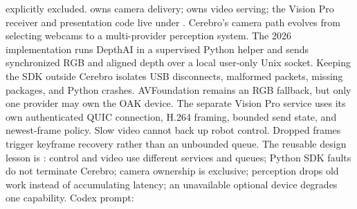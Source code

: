 {}explicitly excluded.\markdownRendererInterblockSeparator
{}\markdownRendererThematicBreak{}\markdownRendererInterblockSeparator
{}
\markdownRendererSectionEnd \markdownRendererSectionBegin
{}\markdownRendererInterblockSeparator
{}\markdownRendererBlockQuoteBegin
{}  owns camera delivery;  owns video serving; the Vision Pro receiver and presentation code live under .\markdownRendererBlockQuoteEnd \markdownRendererInterblockSeparator
{}Cerebro's camera path evolves from selecting webcams to a multi-provider\markdownRendererSoftLineBreak
{}perception system.\markdownRendererParagraphSeparator
{}The 2026 implementation runs DepthAI in a supervised Python helper and sends\markdownRendererSoftLineBreak
{}synchronized RGB and aligned depth over a local user-only Unix socket. Keeping\markdownRendererSoftLineBreak
{}the SDK outside Cerebro isolates USB disconnects, malformed packets, missing\markdownRendererSoftLineBreak
{}packages, and Python crashes. AVFoundation remains an RGB fallback, but only\markdownRendererSoftLineBreak
{}one provider may own the OAK device.\markdownRendererParagraphSeparator
{}The separate Vision Pro service uses its own authenticated QUIC connection,\markdownRendererSoftLineBreak
{}H.264 framing, bounded send state, and newest-frame policy. Slow video cannot\markdownRendererSoftLineBreak
{}back up robot control. Dropped frames trigger keyframe recovery rather than an\markdownRendererSoftLineBreak
{}unbounded queue.\markdownRendererParagraphSeparator
{}The reusable design lesson is :\markdownRendererInterblockSeparator
{}\markdownRendererUlBegin
\markdownRendererUlItem control and video use different services and queues;\markdownRendererUlItemEnd 
\markdownRendererUlItem Python SDK faults do not terminate Cerebro;\markdownRendererUlItemEnd 
\markdownRendererUlItem camera ownership is exclusive;\markdownRendererUlItemEnd 
\markdownRendererUlItem perception drops old work instead of accumulating latency;\markdownRendererUlItemEnd 
\markdownRendererUlItem an unavailable optional device degrades one capability.\markdownRendererUlItemEnd 
\markdownRendererUlEnd \markdownRendererInterblockSeparator
{}Codex prompt:\markdownRendererInterblockSeparator
